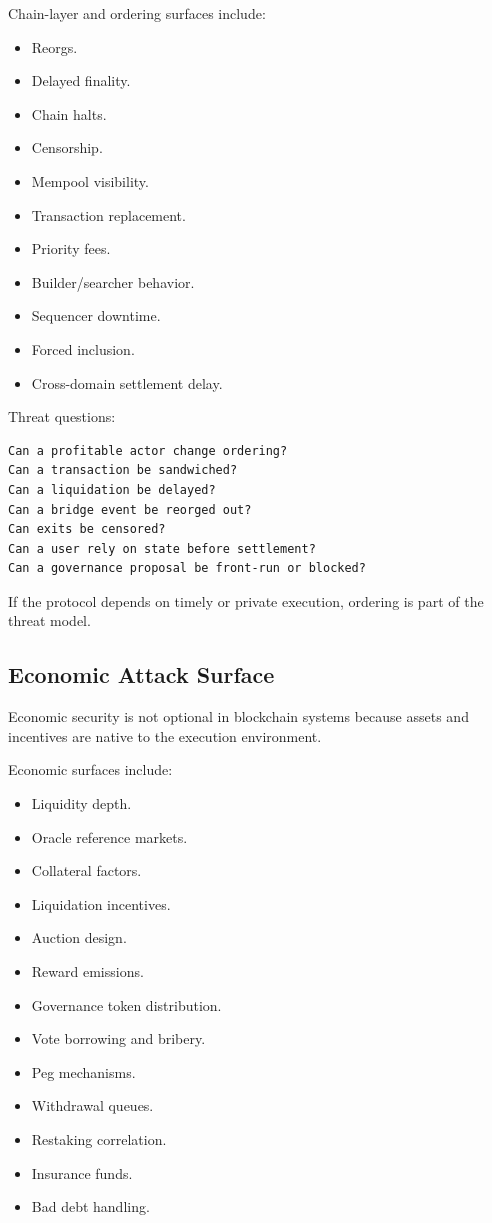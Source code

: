 Chain-layer and ordering surfaces include:

\begin{itemize}
\tightlist
\item
  Reorgs.
\item
  Delayed finality.
\item
  Chain halts.
\item
  Censorship.
\item
  Mempool visibility.
\item
  Transaction replacement.
\item
  Priority fees.
\item
  Builder/searcher behavior.
\item
  Sequencer downtime.
\item
  Forced inclusion.
\item
  Cross-domain settlement delay.
\end{itemize}

Threat questions:

\begin{lstlisting}
Can a profitable actor change ordering?
Can a transaction be sandwiched?
Can a liquidation be delayed?
Can a bridge event be reorged out?
Can exits be censored?
Can a user rely on state before settlement?
Can a governance proposal be front-run or blocked?
\end{lstlisting}

If the protocol depends on timely or private execution, ordering is part
of the threat model.

\subsection{Economic Attack Surface}

Economic security is not optional in blockchain systems because assets
and incentives are native to the execution environment.

Economic surfaces include:

\begin{itemize}
\tightlist
\item
  Liquidity depth.
\item
  Oracle reference markets.
\item
  Collateral factors.
\item
  Liquidation incentives.
\item
  Auction design.
\item
  Reward emissions.
\item
  Governance token distribution.
\item
  Vote borrowing and bribery.
\item
  Peg mechanisms.
\item
  Withdrawal queues.
\item
  Restaking correlation.
\item
  Insurance funds.
\item
  Bad debt handling.
\end{itemize}


